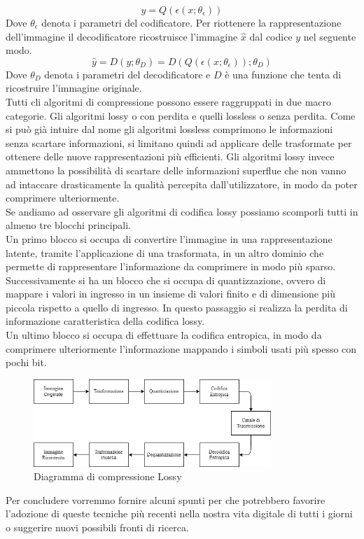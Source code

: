 \begin{equation}\label{eq:eqCondificatore}
    y = Q(\epsilon (x;\theta_{\epsilon}))
\end{equation}
Dove $\theta_{\epsilon}$ denota i parametri del codificatore.
\newpage
Per riottenere la rappresentazione dell’immagine il decodificatore ricostruisce l’immagine $\hat{x}$ dal codice $y$ nel seguente modo.\\
\begin{equation}\label{eq:eqDecodificatore}
    \hat{y} = D(y;\theta_{D}) = D(Q(\epsilon (x;\theta_{\epsilon}));\theta_{D})
\end{equation}
Dove $\theta_{D}$ denota i parametri del decodificatore e $D$ è una funzione che tenta di ricostruire l'immagine originale.\cite{hu2021learning}\\
Tutti cli algoritmi di compressione possono essere raggruppati in due macro categorie. Gli algoritmi lossy o con perdita e quelli lossless o senza perdita. Come si può già intuire dal nome gli algoritmi lossless comprimono le informazioni senza scartare informazioni, si limitano quindi ad applicare delle trasformate per ottenere delle nuove rappresentazioni più efficienti. Gli algoritmi lossy invece ammettono la possibilità di scartare delle informazioni superflue che non vanno ad intaccare drasticamente la qualità percepita dall'utilizzatore, in modo da poter comprimere ulteriormente.\\
Se andiamo ad osservare gli algoritmi di codifica lossy possiamo scomporli tutti in almeno tre blocchi principali.\cite{sadeeq2021image} \\
Un primo blocco si occupa di convertire l’immagine in una rappresentazione latente, tramite l’applicazione di una trasformata, in un altro dominio che permette di rappresentare l’informazione da comprimere in modo più sparso.\\
Successivamente si ha un blocco che si occupa di quantizzazione, ovvero di mappare i valori in ingresso in un insieme di valori finito e di dimensione più piccola rispetto a quello di ingresso. In questo passaggio si realizza la perdita di informazione caratteristica della codifica lossy.\\
Un ultimo blocco si occupa di effettuare la codifica entropica, in modo da comprimere ulteriormente l’informazione mappando i simboli usati più spesso con pochi bit.\\
\begin{figure}[ht]
    \centering
    \includegraphics[width=0.8\textwidth]{Immagini/LossyCompressorDiagram.png}
    \caption{Diagramma di compressione Lossy}
    \label{fig:LossyCompressorDiagram}
\end{figure}
Per concludere vorremmo fornire alcuni spunti per che potrebbero favorire l’adozione di queste tecniche più recenti nella nostra vita digitale di tutti i giorni o suggerire nuovi possibili fronti di ricerca.
 
